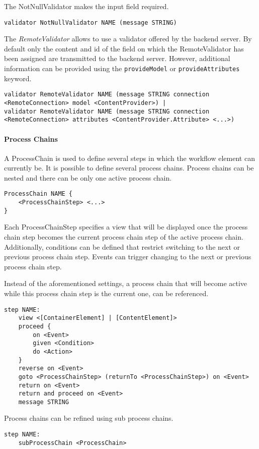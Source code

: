The NotNullValidator makes the input field required.
\begin{lstlisting}
validator NotNullValidator NAME (message STRING)
\end{lstlisting}

The \textit{RemoteValidator} allows to use a validator offered by the backend server. By default only the content and id of the field on which the RemoteValidator has been assigned are transmitted to the backend server. However, additional information can be provided using the \lstinline!provideModel! or
\lstinline!provideAttributes! keyword.
\begin{lstlisting}
validator RemoteValidator NAME (message STRING connection <RemoteConnection> model <ContentProvider>) |
validator RemoteValidator NAME (message STRING connection <RemoteConnection> attributes <ContentProvider.Attribute> <...>)
\end{lstlisting}

\paragraph{Process Chains}
\label{sec:processChain}
A ProcessChain is used to define several steps in which the workflow element can currently be. It is possible to define several process chains. Process chains can be nested and there can be only one active process chain.
\begin{lstlisting}
ProcessChain NAME {
	<ProcessChainStep> <...>
}
\end{lstlisting}

Each ProcessChainStep specifies a view that will be displayed once the process chain step becomes the current process chain step of the active process chain. Additionally, conditions can be defined that restrict switching to the next or previous process chain step. Events can trigger changing to the next or previous process chain step.
 
Instead of the aforementioned settings, a process chain that will become active while this process chain step is the current one, can be referenced.
\begin{lstlisting}
step NAME:
	view <[ContainerElement] | [ContentElement]>
	proceed {
		on <Event>
		given <Condition>
		do <Action>
	}
	reverse on <Event>
	goto <ProcessChainStep> (returnTo <ProcessChainStep>) on <Event>
	return on <Event>
	return and proceed on <Event>
	message STRING
\end{lstlisting}

Process chains can be refined using sub process chains.
\begin{lstlisting}
step NAME:
	subProcessChain <ProcessChain>
\end{lstlisting}

